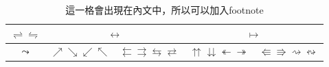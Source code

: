 \begin{table}[ht]
    \centering
    \renewcommand{\arraystretch}{1.2}

    \begin{tabular}{ c | c | c | c | C{10em}}
        $\rightleftharpoons \leftrightharpoons $ &  &                                                                                                                                                                                  \\\hline
        $\leadsto $                              & $\nearrow \searrow \swarrow \nwarrow  $      & $\leftleftarrows \rightrightarrows \leftrightarrows \rightleftarrows  $ & $\upuparrows \downdownarrows \twoheadleftarrow \twoheadrightarrow  $ & $\Lleftarrow \Rrightarrow \rightsquigarrow \leftrightsquigarrow  $ \\ \hline\hline
    \end{tabular}

    \renewcommand{\arraystretch}{1}

    \caption[這一格會出現在表目錄中]{這一格會出現在內文中，所以可以加入footnote\footnotemark}
    \label{tab:tabexample8}
\end{table}
